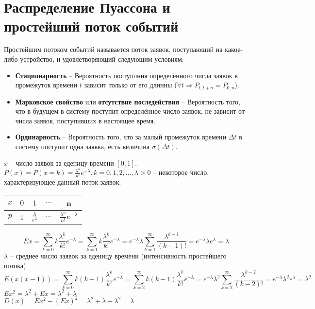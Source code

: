 \section{Распределение Пуассона и простейший поток событий}
\begin{definition}
Простейшим потоком событий называется поток заявок, поступающий на какое-либо устройство, и удовлетворяющий следующим условиям:
\begin{itemize}
\item \textbf{Стационарность} -- Вероятность поступлния определённого числа заявок в промежуток времени $t$ зависит только от его длинны ($\forall t \Rightarrow P_{t, t+n} = P_{0,n}$).
\item \textbf{Марковское свойство} или \textbf{отсутствие последействия} -- Вероятность того, что в будущем в систему поступит определённое число заявок, не зависит от числа заявок, поступивших в настоящее время.
\item \textbf{Ординарность} -- Вероятность того, что за малый промежуток времени $\Delta t$ в систему поступит одна заявка, есть величина $\sigma(\Delta t)$.
\end{itemize}
\end{definition}
$x$ -- число заявок за еденицу времени $[0,1]$.\\
$P(x)=P(x=k)=\frac{\lambda^k}{k!}e^{-\lambda}, k=0,1,2,..., \lambda > 0$ -- некоторое число, характеризующее данный поток заявок.\\
\begin{tabular}{c|cccc}
$x$ & $0$ & $1$ & $...$ & n\\
\hline
$p$ & $1$ & $\frac{\lambda}{e^\lambda}$ & $...$ & $\frac{\lambda^n}{n!}e^{-\lambda}$
\end{tabular}
$$Ex=\sum\limits_{k=0}^\infty k \frac{\lambda^k}{k!}e^{-\lambda}=\sum\limits_{k=1}^\infty k \frac{\lambda^k}{k!}e^{-\lambda}=e^{-\lambda}\lambda\sum\limits_{k=1}^\infty \frac{\lambda^{k-1}}{(k-1)!}=e^{-\lambda}\lambda e^\lambda = \lambda$$
$\lambda$ -- среднее число заявок за еденицу времени (интенсивность простейшего потока)
$$E(x(x-1))=\sum\limits_{k=0}^\infty k(k-1) \frac{\lambda^k}{k!}e^{-\lambda}=\sum\limits_{k=2}^\infty k(k-1) \frac{\lambda^k}{k!}e^{-\lambda}=e^{-\lambda}\lambda^2 \sum\limits_{k=2}^\infty \frac{\lambda^{k-2}}{(k-2)!}=e^{-\lambda}\lambda^2 e^\lambda = \lambda^2$$
$Ex^2 = \lambda^2+Ex=\lambda^2+\lambda$\\
$D(x)=Ex^2-(Ex)^2 = \lambda^2+\lambda-\lambda^2 = \lambda$
